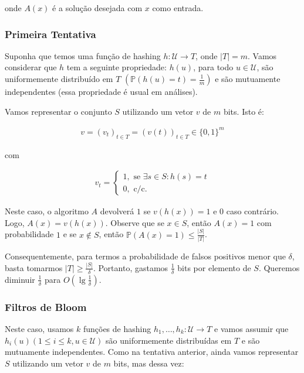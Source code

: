 onde $A(x)$ é a solução desejada com $x$ como entrada.

\subsubsection{Primeira Tentativa}
  
Suponha que temos uma função de hashing
$h: \mathcal{U} \rightarrow T$, onde $|T|=m$. Vamos considerar que $h$
tem a seguinte propriedade: $h(u)$, para todo $u \in \mathcal{U}$, são
uniformemente distribuído em $T$ $\left(
\mathbb{P}(h(u)=t)=\frac{1}{m}\right)$ e são mutuamente independentes (essa
propriedade é usual em análises).

Vamos representar o conjunto $S$ utilizando um vetor $v$ de $m$
bits. Isto é:

\begin{align*}
v = (v_{t})_{t \in T} = (v(t))_{t\in T} \in \{0,1\}^{m}
\end{align*}

com

\begin{align*}
  v_{t}=\begin{cases}
    1, \text{ se } \exists s \in S : h(s)=t \\
    0, \text{ c/c. }
 \end{cases}
\end{align*}

Neste caso, o algoritmo $A$ devolverá $1$ se $v(h(x))=1$ e $0$ caso
contrário. Logo, $A(x)=v(h(x))$. Observe que se $x \in S$, então
$A(x)=1$ com probabilidade $1$ e se $x \notin S$, então
$\mathbb{P}(A(x)=1)\leq \frac{|S|}{|T|}$.

Consequentemente, para termos a probabilidade de falsos positivos
menor que $\delta$, basta tomarmos $|T| \geq
\frac{|S|}{\delta}$. Portanto, gastamos $\frac{1}{\delta}$ bits por
elemento de $S$. Queremos diminuir $\frac{1}{\delta}$ para
$O(\lg \frac{1}{\delta})$.

\subsubsection{Filtros de Bloom}

Neste caso, usamos $k$ funções de hashing
$h_{1},\dots,h_{k}:\mathcal{U} \rightarrow T$ e vamos assumir que
$h_{i}(u) (1 \leq i \leq k, u \in \mathcal{U})$ são uniformemente
distribuídas em $T$ e são mutuamente independentes. Como na tentativa
anterior, ainda vamos representar $S$ utilizando um vetor $v$ de $m$
bits, mas dessa vez:


